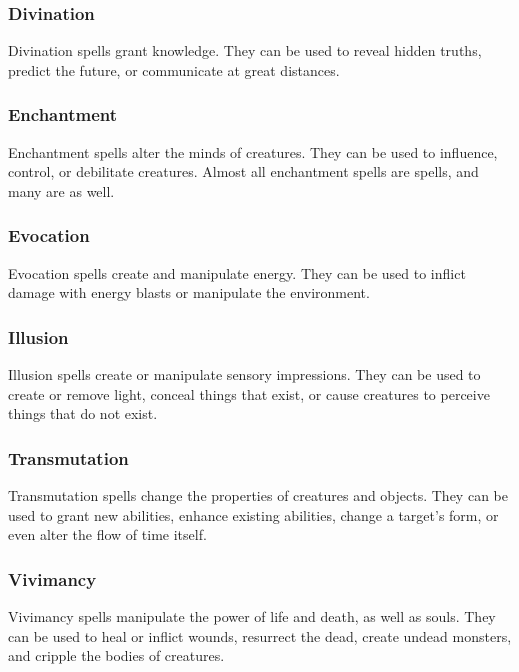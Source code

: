         \subsubsection{Divination}
            Divination spells grant knowledge.
            They can be used to reveal hidden truths, predict the future, or communicate at great distances.

        \subsubsection{Enchantment}
            Enchantment spells alter the minds of creatures.
            They can be used to influence, control, or debilitate creatures.
            Almost all enchantment spells are  spells, and many are  as well.

        \subsubsection{Evocation}
            Evocation spells create and manipulate energy.
            They can be used to inflict damage with energy blasts or manipulate the environment.

        \subsubsection{Illusion}
            Illusion spells create or manipulate sensory impressions.
            They can be used to create or remove light, conceal things that exist, or cause creatures to perceive things that do not exist.

        \subsubsection{Transmutation}
            Transmutation spells change the properties of creatures and objects.
            They can be used to grant new abilities, enhance existing abilities, change a target's form, or even alter the flow of time itself.

        \subsubsection{Vivimancy}
            Vivimancy spells manipulate the power of life and death, as well as souls.
            They can be used to heal or inflict wounds, resurrect the dead, create undead monsters, and cripple the bodies of creatures.

